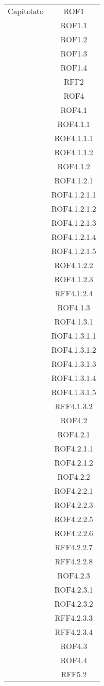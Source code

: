 \begin{longtable}{|c|c|}
\midrule
Capitolato
& ROF1\\
& ROF1.1\\
& ROF1.2\\
& ROF1.3\\
& ROF1.4\\
& RFF2\\
& ROF4\\
& ROF4.1\\
& ROF4.1.1\\
& ROF4.1.1.1\\
& ROF4.1.1.2\\
& ROF4.1.2\\
& ROF4.1.2.1\\
& ROF4.1.2.1.1\\
& ROF4.1.2.1.2\\
& ROF4.1.2.1.3\\
& ROF4.1.2.1.4\\
& ROF4.1.2.1.5\\
& ROF4.1.2.2\\
& ROF4.1.2.3\\
& RFF4.1.2.4\\
& ROF4.1.3\\
& ROF4.1.3.1\\
& ROF4.1.3.1.1\\
& ROF4.1.3.1.2\\
& ROF4.1.3.1.3\\
& ROF4.1.3.1.4\\
& ROF4.1.3.1.5\\
& RFF4.1.3.2\\
& ROF4.2\\
& ROF4.2.1\\
& ROF4.2.1.1\\
& ROF4.2.1.2\\
& ROF4.2.2\\
& ROF4.2.2.1\\
& ROF4.2.2.3\\
& ROF4.2.2.5\\
& ROF4.2.2.6\\
& RFF4.2.2.7\\
& RFF4.2.2.8\\
& ROF4.2.3\\
& ROF4.2.3.1\\
& ROF4.2.3.2\\
& RFF4.2.3.3\\
& RFF4.2.3.4\\
& ROF4.3\\
& ROF4.4\\
& RFF5.2\\

\end{longtable}
